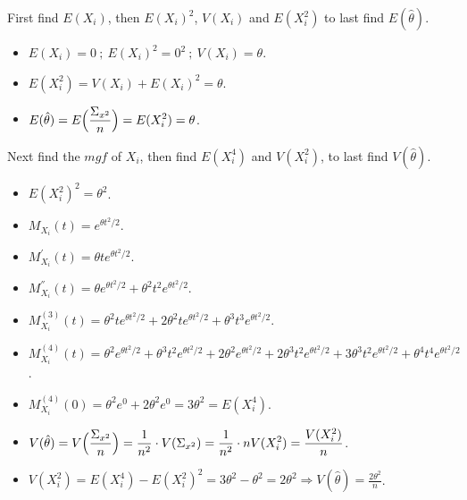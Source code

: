 \documentclass[12pt]{article}
\newcommand{\ds}{\displaystyle}
\begin{document}
\noindent
First find $ E(X_{i}) $, then $ E(X_{i})^{2} $, $ V(X_{i}) $ and $ E(X_{i}^{2}) $ to last find $ E(\hat{\theta}) $. \\

\begin{itemize}
    \item $ \ds E(X_{i}) = 0 \ ; \ E(X_{i})^{2} = 0^{2} \ ; \ V(X_{i}) = \theta $.
    \item $ \ds E(X_{i}^{2}) = V(X_{i}) + E(X_{i})^{2} = \theta $.
    \item $ \ds E(\hat{\theta}) = E\Bigl( \frac{\Sigma_{x^{2}}}{n} \Bigr) = E(X_{i}^{2}) = \theta $.
\end{itemize}

\noindent
Next find the $ mgf $ of $ X_{i} $, then find $ E(X_{i}^{4}) $ and $ V(X_{i}^{2}) $, to last find $ V(\hat{\theta}) $. \\

\begin{itemize}
    \item $ \ds E(X_{i}^{2})^{2} = \theta^{2} $.
    \item $ \ds M_{X_{i}}(t) = e^{\theta t^{2} / 2} $.
    \item $ \ds M_{X_{i}}^{'}(t) = \theta t e^{\theta t^{2} / 2} $.
    \item $ \ds M_{X_{i}}^{''}(t) = \theta e^{\theta t^{2} / 2} + \theta^{2} t^{2} e^{\theta t^{2} / 2} $.
    \item $ \ds M_{X_{i}}^{(3)}(t) = \theta^{2} t e^{\theta t^{2} / 2} + 2 \theta^{2} t e^{\theta t^{2} / 2} + \theta^{3} t^{3} e^{\theta t^{2} / 2} $.
    \item $ \ds M_{X_{i}}^{(4)}(t) = \theta^{2} e^{\theta t^{2} / 2} + \theta^{3} t^{2} e^{\theta t^{2} / 2} + 2 \theta^{2} e^{\theta t^{2} / 2} + 2 \theta^{3} t^{2} e^{\theta t^{2} / 2} + 3\theta^{3} t^{2} e^{\theta t^{2} / 2} + \theta^{4} t^{4} e^{\theta t^{2} / 2} $.
    \item $ \ds M_{X_{i}}^{(4)}(0) = \theta^{2} e^{0} + 2 \theta^{2} e^{0} = 3\theta^{2} = E(X_{i}^{4})$.
    \item $ \ds V(\hat{\theta}) = V \Bigl( \frac{\Sigma_{x^{2}}}{n} \Bigr) = \frac{1}{n^{2}} \cdot V(\Sigma_{x^{2}}) = \frac{1}{n^{2}} \cdot nV(X_{i}^{2}) = \frac{V(X_{i}^{2})}{n} $.
    \item $ \ds V(X_{i}^{2}) = E(X_{i}^{4}) - E(X_{i}^{2})^{2} = 3\theta^{2} - \theta^{2} = 2\theta^{2} \Rightarrow V(\hat{\theta}) = \frac{2\theta^{2}}{n} $.
\end{itemize}
\end{document}
